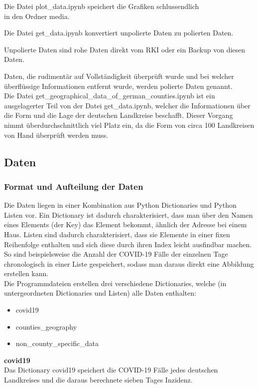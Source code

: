 Die Datei \glqq{}plot\_data.ipynb\grqq{} speichert die Grafiken schlussendlich\\
in den Ordner \glqq{}media\grqq{}.

Die Datei \glqq{}get\_data.ipynb\grqq{} konvertiert \glqq{}unpolierte\grqq{} Daten zu \glqq{}polierten\grqq{} Daten.

\glqq{}Unpolierte\grqq{} Daten sind rohe Daten direkt vom RKI oder ein Backup von diesen Daten.

Daten, die rudimentär auf Vollständigkeit überprüft wurde und bei welcher überflüssige Informationen entfernt wurde, werden \glqq{}polierte\grqq{} Daten genannt.\\
Die Datei \glqq{}get\_geographical\_data\_of\_german\_counties.ipynb\grqq{} ist ein ausgelagerter Teil von der Datei \glqq{}get\_data.ipynb\grqq{}, welcher die Informationen über die Form und die Lage der deutschen Landkreise beschafft. Dieser Vorgang nimmt überdurchschnittlich viel Platz ein, da die Form von circa 100 Landkreisen von Hand überprüft werden muss.

\subsection{Daten}
\subsubsection{Format und Aufteilung der Daten}
Die Daten liegen in einer Kombination aus Python Dictionaries und Python Listen vor. Ein Dictionary ist dadurch charakterisiert, dass man über den Namen eines Elements (der \glqq{}Key\grqq{}) das Element bekommt, ähnlich der Adresse bei einem Haus. Listen sind dadurch charakterisiert, dass sie Elemente in einer fixen Reihenfolge enthalten und sich diese durch ihren Index leicht ausfindbar machen. So sind beispielsweise die Anzahl der COVID-19 Fälle der einzelnen Tage chronologisch in einer Liste gespeichert, sodass man daraus direkt eine Abbildung erstellen kann.\ \\
Die Programmdateien erstellen drei verschiedene Dictionaries, welche (in untergeordneten Dictionaries und Listen) alle Daten enthalten:
\begin{itemize}
    \item covid19
    \item counties\_geography
    \item non\_county\_specific\_data
\end{itemize}

\textbf{covid19}\\
Das Dictionary covid19 speichert die COVID-19 Fälle jedes deutschen Landkreises und die daraus berechnete sieben Tages Inzidenz.

